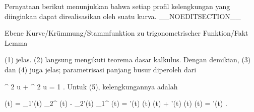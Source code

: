 Pernyataan berikut menunjukkan bahwa setiap profil kelengkungan yang diinginkan dapat direalisasikan oleh suatu kurva.
__NOEDITSECTION__

{Ebene Kurve/Krümmung/Stammfunktion zu trigonometrischer Funktion/Fakt}
{Lemma}
{}
{

\faktzusatz {}
\faktzusatz {}

}
{

(1) jelas. (2) langsung mengikuti teorema dasar kalkulus. Dengan demikian, (3) dan (4) juga jelas; parametrisasi panjang busur diperoleh dari

\mavergleichskette
{\vergleichskette
{ \cos^{ 2  }  u + \sin^{ 2  }  u
}
{ = }{ 1
}
{  }{
}
{    }{
}
{   }{
}
}
{}{}{.}
Untuk (5), kelengkungannya adalah

\mavergleichskettedisp
{\vergleichskette
{ \kappa(t)
}
{ =} { \gamma_1'(t) \gamma_2^{\prime \prime} (t) - \gamma_2'(t) \gamma_1^{\prime \prime} (t)
}
{ =} { \psi'(t) \cos  \psi(t)  \cos  \psi(t) + \psi'(t)  \sin  \psi(t)  \sin  \psi(t)
}
{ =} { \psi'(t)
}
{ } {
}
}
{}{}{.}

}

